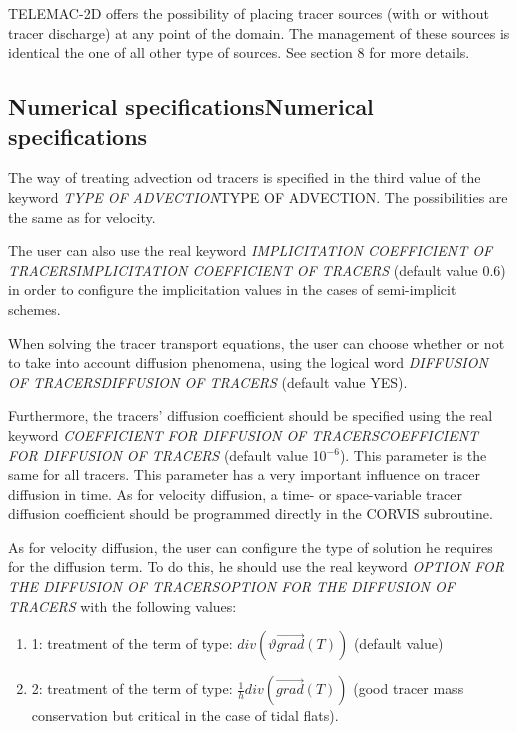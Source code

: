 \documentclass{article} %
\begin{document}
 TELEMAC-2D offers the possibility of placing tracer sources (with or without tracer discharge) at any point of the domain. The management of these sources is identical the one of all other type of sources. See section 8 for more details.


\subsection{ Numerical specificationsNumerical specifications}

 The way of treating advection od tracers is specified in the third value of the keyword \textit{TYPE OF ADVECTION}TYPE OF ADVECTION. The possibilities are the same as for velocity.

 The user can also use the real keyword \textit{IMPLICITATION COEFFICIENT OF TRACERSIMPLICITATION COEFFICIENT OF TRACERS} (default value 0.6) in order to configure the implicitation values in the cases of semi-implicit schemes.

 When solving the tracer transport equations, the user can choose whether or not to take into account diffusion phenomena, using the logical word \textit{DIFFUSION OF TRACERSDIFFUSION OF TRACERS} (default value YES).

 Furthermore, the tracers' diffusion coefficient should be specified using the real keyword \textit{COEFFICIENT FOR DIFFUSION OF TRACERSCOEFFICIENT FOR DIFFUSION OF TRACERS} (default value 10${}^{-6}$). This parameter is the same for all tracers. This parameter has a very important influence on tracer diffusion in time. As for velocity diffusion, a time- or space-variable tracer diffusion coefficient should be programmed directly in the CORVIS subroutine.

 As for velocity diffusion, the user can configure the type of solution he requires for the diffusion term. To do this, he should use the real keyword \textit{OPTION FOR THE DIFFUSION OF TRACERSOPTION FOR THE DIFFUSION OF TRACERS} with the following values:

\begin{enumerate}
\item  1: treatment of the term of type: $div\left(\vartheta \overrightarrow{grad}\left(T\right)\right)$ (default value)

\item  2: treatment of the term of type: $\frac{1}{h}div\left(\overrightarrow{grad}\left(T\right)\right)$ (good tracer mass conservation but critical in the case of tidal flats).
\end{enumerate}
\end{document}
